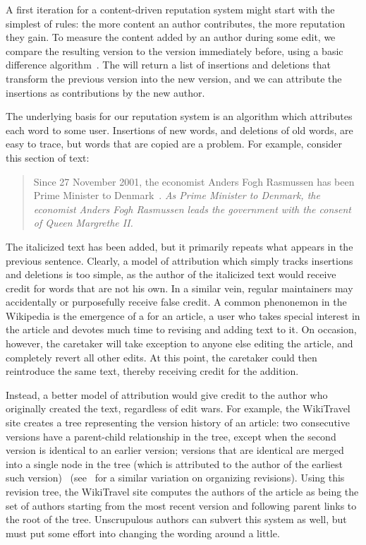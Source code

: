 
A first iteration for a content-driven reputation system
might start with the simplest of rules: the more content
an author contributes, the more reputation they gain.
To measure the content added by an author during some edit,
we compare the resulting version to the version immediately before,
using a basic difference algorithm~\cite{Myers86,TichyEditDist,BurnsLong97}.
The  will return a list of insertions
and deletions that transform the previous version into
the new version, and we can attribute the insertions
as contributions by the new author.

The underlying basis for our reputation system
is an algorithm which attributes each word to some user.
Insertions of new words, and deletions of old words,
are easy to trace, but words that are copied are a problem.
For example, consider this section of text:
%
\begin{quote}
Since 27 November 2001, the economist Anders Fogh Rasmussen
has been Prime Minister to Denmark~\cite{wiki:Denmark-Fogh}.
\textit{As Prime Minister to Denmark, the economist Anders Fogh Rasmussen
leads the government with the consent of Queen Margrethe II.}
\end{quote}
%
The italicized text has been added, but it primarily repeats
what appears in the previous sentence.
Clearly, a model of attribution which simply tracks insertions
and deletions is too simple, as the author of the italicized
text would receive credit for words that are not his own.
In a similar vein,
regular maintainers may accidentally or purposefully receive
false credit.
A common phenonemon in the Wikipedia is the emergence
of a  for an article, a user who takes
special interest in the article and devotes much time
to revising and adding text to it.
On occasion, however, the caretaker will take exception to
anyone else editing the article, and completely revert all other edits.
At this point, the caretaker could then reintroduce
the same text, thereby receiving credit for the addition.

Instead, a better model of attribution would give credit
to the author who originally created the text,
regardless of edit wars.
For example, the WikiTravel site creates a tree representing
the version history of an article: two consecutive versions
have a parent-child relationship in the tree, except when
the second version is identical to an earlier version;
versions that are identical are merged into a single node
in the tree (which is attributed to the author of the earliest
such version)~\cite{WikiTravelAuthorship}
(see~\cite{Sabel2007} for a similar variation on organizing revisions).
Using this revision tree, the WikiTravel site computes the
authors of the article as being the set of authors starting
from the most recent version and following parent links
to the root of the tree.
Unscrupulous authors can subvert this system as
well, but must put some effort into changing
the wording around a little.


